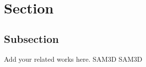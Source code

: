 
\hspace{24pt}
\section{Section}
\subsection{Subsection}

Add your related works here.
SAM3D\cite{sam3d2025} SAM3D\cite{sam3d2025, diffdope2023}
